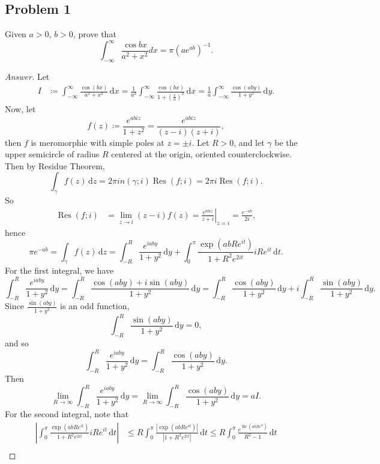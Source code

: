 \documentclass[12pt]{article}
\newcommand\inv[1]{#1^{-1}}
\newcommand\paren[1]{\left( #1 \right)}
\newcommand{\abs}[1]{\left| #1 \right|}
\theoremstyle{definition}
\DeclareMathOperator\Res{Res}
\DeclareMathOperator\re{Re}
\begin{document}
\subsection{Problem 1}
Given $a > 0$, $b > 0$, prove that 
\[
    \int_{-\infty}^{\infty} \frac{\cos bx}{a^2 + x^2} dx = \pi \inv{ \paren{ a e^{ab} } }.
\]
\begin{proof}[Answer]
    Let 
    \begin{align*}
        I & \coloneqq \int_{-\infty}^{\infty} \frac{\cos(bx)}{a^2 + x^2} \, \mathrm{d}x = \frac{1}{a^2} \int_{-\infty}^{\infty} \frac{\cos(bx)}{1 + \paren{ \frac{x}{a} }^2} \, \mathrm{d}x = \frac{1}{a} \int_{-\infty}^{\infty} \frac{\cos(aby)}{1+y^2} \, \mathrm{d}y.
    \end{align*}
    Now, let 
    \[
        f(z) \coloneqq \frac{e^{abiz}}{1 + z^2} = \frac{e^{abiz}}{(z-i)(z+i)},
    \]
    then $f$ is meromorphic with simple poles at $z = \pm i$. Let $R > 0$, and let $\gamma$ be the upper semicircle of radius $R$ centered at the origin, oriented counterclockwise. Then by Residue Theorem,
    \[
        \int_{\gamma} f(z) \, \mathrm{d}z = 2\pi i n(\gamma;i) \Res(f;i) = 2\pi i \Res(f;i).
    \]
    So
    \begin{align*}
        \Res(f;i) & = \lim\limits_{z \to i} (z-i) f(z) = \left. \frac{e^{abiz}}{z+i} \right|_{z = i} = \frac{e^{-ab}}{2i},
    \end{align*}
    hence
    \[
        \pi e^{-ab} = \int_{\gamma} f(z) \, \mathrm{d}z = \int_{-R}^R \frac{e^{iaby}}{1+y^2} \, \mathrm{d}y + \int_{0}^{\pi} \frac{ \exp \paren{abRe^{it} } }{ 1 + R^2 e^{2it} } iRe^{it} \, \mathrm{d}t.
    \]
    For the first integral, we have
    \[
        \int_{-R}^R \frac{e^{iaby}}{1+y^2} \, \mathrm{d}y = \int_{-R}^R \frac{\cos(aby) + i \sin(aby)}{1+y^2} \, \mathrm{d}y = \int_{-R}^R \frac{\cos(aby)}{1+y^2} \, \mathrm{d}y + i \int_{-R}^R \frac{\sin(aby)}{1+y^2} \, \mathrm{d}y.  
    \]
    Since $\frac{\sin(aby)}{1+y^2}$ is an odd function,
    \[
        \int_{-R}^R \frac{\sin(aby)}{1+y^2} \, \mathrm{d}y = 0,
    \]
    and so 
    \[
        \int_{-R}^R \frac{e^{iaby}}{1+y^2} \, \mathrm{d}y = \int_{-R}^R \frac{\cos(aby)}{1+y^2} \, \mathrm{d}y.
    \]
    Then 
    \[
        \lim\limits_{R \to \infty} \int_{-R}^R \frac{e^{iaby}}{1+y^2} \, \mathrm{d}y = \lim\limits_{R \to \infty} \int_{-R}^R \frac{\cos(aby)}{1+y^2} \, \mathrm{d}y = a I.
    \]
    For the second integral, note that
    \begin{align*}
        \abs{ \int_{0}^{\pi} \frac{ \exp \paren{abRe^{it} } }{ 1 + R^2 e^{2it} } iRe^{it} \, \mathrm{d}t } & \leq R \int_0^{\pi} \frac{ \abs{ \exp \paren{ abRe^{it} } } }{ \abs{ 1 + R^2 e^{2it} } } \, \mathrm{d}t \leq R \int_0^{\pi} \frac{ e^{ \re \paren{ ab Re^{it} } } }{ R^2 - 1 } \, \mathrm{d}t \\

\end{align*}
\end{proof}
\end{document}
